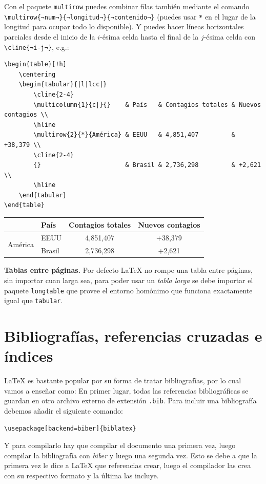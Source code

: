 Con el paquete \texttt{multirow} puedes combinar filas también mediante el comando \lstinline|\multirow{¬num¬}{¬longitud¬}{¬contenido¬}| (puedes usar \texttt{*} en el lugar de la longitud para ocupar todo lo disponible). Y puedes hacer líneas horizontales parciales desde el inicio de la $i$-ésima celda hasta el final de la $j$-ésima celda con \lstinline|\cline{¬i-j¬}|, e.g.:
\begin{lstlisting}[basicstyle=\footnotesize\ttfamily]
\begin{table}[!h]
	\centering
	\begin{tabular}{|l|lcc|}
		\cline{2-4}
		\multicolumn{1}{c|}{}    & País   & Contagios totales & Nuevos contagios \\
		\hline
		\multirow{2}{*}{América} & EEUU   & 4,851,407         & +38,379 \\
		\cline{2-4}
		{}                       & Brasil & 2,736,298         & +2,621  \\
		\hline
	\end{tabular}
\end{table}
\end{lstlisting}
\begin{table}[!h]
	\centering
	\begin{tabular}{|l|lcc|}
		\cline{2-4}
		\multicolumn{1}{c|}{}    & País   & Contagios totales & Nuevos contagios \\
		\hline
		\multirow{2}{*}{América} & EEUU   & 4,851,407         & +38,379 \\
		\cline{2-4}
		{}                       & Brasil & 2,736,298         & +2,621  \\
		\hline
	\end{tabular}
\end{table}
\textbf{Tablas entre páginas.} Por defecto \LaTeX{} no rompe una tabla entre páginas, sin importar cuan larga sea, para poder usar un \textit{tabla larga} se debe importar el paquete \texttt{longtable} que provee el entorno homónimo que funciona exactamente igual que \texttt{tabular}.

\section{Bibliografías, referencias cruzadas e índices}
\label{sec:crossref}
\LaTeX{} es bastante popular por su forma de tratar bibliografías, por lo cual vamos a enseñar como: En primer lugar, todas las referencias bibliográficas se guardan en otro archivo externo de extensión \texttt{.bib}. Para incluir una bibliografía debemos añadir el siguiente comando:
\begin{lstlisting}
\usepackage[backend=biber]{biblatex}

\end{lstlisting}
Y para compilarlo hay que compilar el documento una primera vez, luego compilar la bibliografía con \textit{biber} y luego una segunda vez. Esto se debe a que la primera vez le dice a \LaTeX{} que referencias crear, luego el compilador las crea con su respectivo formato y la última las incluye.


